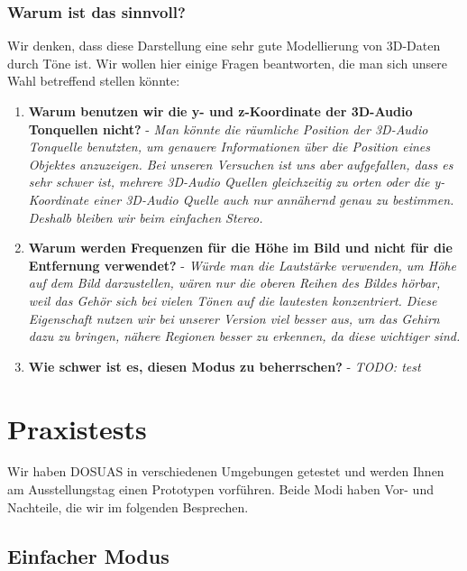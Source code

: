 \documentclass[a4paper,12pt,ngerman]{scrartcl}
\begin{document}
\subsubsection{Warum ist das sinnvoll?}

Wir denken, dass diese Darstellung eine sehr gute Modellierung von 3D-Daten durch Töne ist. Wir wollen hier einige 
Fragen beantworten, die man sich unsere Wahl betreffend stellen könnte:
\begin{enumerate}
	\item \textbf{Warum benutzen wir die y- und z-Koordinate der 3D-Audio Tonquellen nicht?} - \textit{Man könnte die
	räumliche Position der 3D-Audio Tonquelle benutzten, um genauere Informationen über die Position eines
	Objektes anzuzeigen. Bei unseren Versuchen ist uns aber aufgefallen, dass es sehr schwer ist, mehrere
	3D-Audio Quellen 
	gleichzeitig zu orten oder die y-Koordinate einer 3D-Audio Quelle auch nur annähernd genau zu bestimmen. Deshalb
	bleiben wir beim einfachen Stereo.}
	\item \textbf{Warum werden Frequenzen für die Höhe im Bild und nicht für die Entfernung verwendet?} - \textit{Würde
	man die Lautstärke verwenden, um Höhe auf dem Bild darzustellen, wären nur die oberen Reihen des Bildes 
	hörbar, weil das Gehör sich bei vielen Tönen auf die lautesten konzentriert. Diese Eigenschaft nutzen wir bei 
	unserer Version viel besser aus, 
	um das Gehirn dazu zu bringen, nähere Regionen besser zu erkennen, da diese wichtiger sind.}
	\item \textbf{Wie schwer ist es, diesen Modus zu beherrschen?} - \textit{TODO: test}
\end{enumerate}

\newpage

\section{Praxistests} \label{testsAndResults}

Wir haben DOSUAS in verschiedenen Umgebungen getestet und werden Ihnen am Ausstellungstag einen Prototypen vorführen.
Beide Modi haben Vor- und Nachteile, die wir im folgenden Besprechen.

\subsection{Einfacher Modus}
\end{document}
